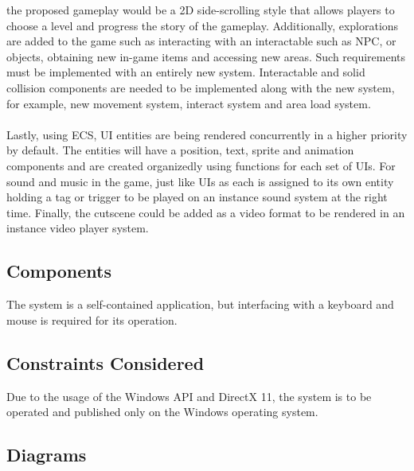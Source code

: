 the proposed gameplay would be a 2D side-scrolling style that allows players to choose a level and progress the story of the gameplay.
Additionally, explorations are added to the game such as interacting with an interactable such as NPC, or objects, obtaining new in-game items and accessing new areas.
Such requirements must be implemented with an entirely new system.
Interactable and solid collision components are needed to be implemented along with the new system, for example, new movement system, interact system and area load system.
\\\\
Lastly, using ECS, UI entities are being rendered concurrently in a higher priority by default.
The entities will have a position, text, sprite and animation components and are created organizedly using functions for each set of UIs.
For sound and music in the game, just like UIs as each is assigned to its own entity holding a tag or trigger to be played on an instance sound system at the right time.
Finally, the cutscene could be added as a video format to be rendered in an instance video player system.



\subsection{Components}
\label{subsec:components}

The system is a self-contained application, but interfacing with a keyboard and mouse is required for its operation.



\subsection{Constraints Considered}
\label{subsec:constraints-considered}

Due to the usage of the Windows API and DirectX 11, the system is to be operated and published only on
the Windows operating system.

\subsection{Diagrams}
\label{subsec:diagrams}

\vspace{0.5cm}

